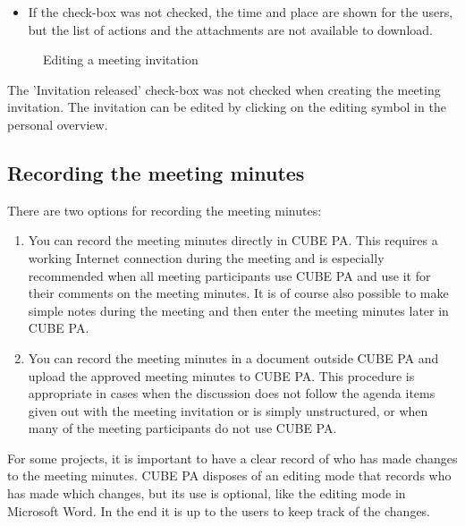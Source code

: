 \begin{itemize}
\item
If the check-box was not checked, the time and place are shown for the users, but the list of actions and the attachments are not available to download.
\end{itemize}

\begin{figure}[H]
\caption{Editing a meeting invitation}
\end{figure}

\begin{small}
The 'Invitation released' check-box was not checked when creating the meeting invitation. The invitation can be edited by clicking on the editing symbol in the personal overview.
\end{small}


\subsection{Recording the meeting minutes}

There are two options for recording the meeting minutes:

\begin{enumerate}
\item
You can record the meeting minutes directly in CUBE PA. This requires a working Internet connection during the meeting and is especially recommended when all meeting participants use CUBE PA and use it for their comments on the meeting minutes. 
It is of course also possible to make simple notes during the meeting and then enter the meeting minutes later in CUBE PA.
\item
You can record the meeting minutes in a document outside CUBE PA and upload the approved meeting minutes to CUBE PA. 
This procedure is appropriate in cases when the discussion does not follow the agenda items given out with the meeting invitation or is simply unstructured, or when many of the meeting participants do not use CUBE PA.
\end{enumerate}

For some projects, it is important to have a clear record of who has made changes to the meeting minutes. CUBE PA disposes of an editing mode that records who has made which changes, but its use is optional, like the editing mode in Microsoft Word. 
In the end it is up to the users to keep track of the changes.

